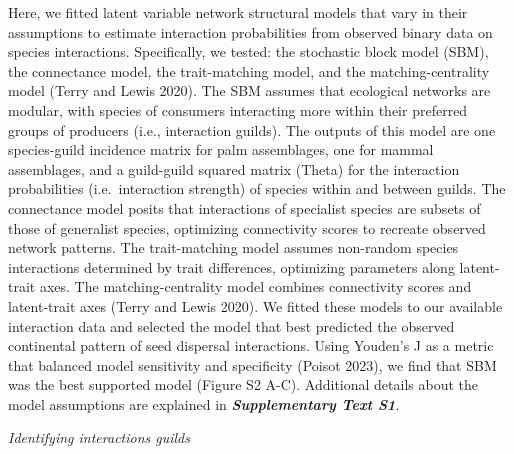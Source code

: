 \documentclass[
]{agujournal2019}
\begin{document}
Here, we fitted latent variable network structural models that vary in
their assumptions to estimate interaction probabilities from observed
binary data on species interactions. Specifically, we tested: the
stochastic block model (SBM), the connectance model, the trait-matching
model, and the matching-centrality model (Terry and Lewis 2020). The SBM
assumes that ecological networks are modular, with species of consumers
interacting more within their preferred groups of producers (i.e.,
interaction guilds). The outputs of this model are one species-guild
incidence matrix for palm assemblages, one for mammal assemblages, and a
guild-guild squared matrix (Theta) for the interaction probabilities
(i.e.~interaction strength) of species within and between guilds. The
connectance model posits that interactions of specialist species are
subsets of those of generalist species, optimizing connectivity scores
to recreate observed network patterns. The trait-matching model assumes
non-random species interactions determined by trait differences,
optimizing parameters along latent-trait axes. The matching-centrality
model combines connectivity scores and latent-trait axes (Terry and
Lewis 2020). We fitted these models to our available interaction data
and selected the model that best predicted the observed continental
pattern of seed dispersal interactions. Using Youden's J as a metric
that balanced model sensitivity and specificity (Poisot 2023), we find
that SBM was the best supported model (Figure S2 A-C). Additional
details about the model assumptions are explained in
\emph{\textbf{Supplementary Text S1}.}

\emph{Identifying interactions guilds}
\end{document}
